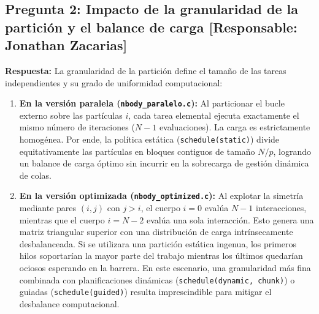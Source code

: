 \documentclass[11pt,a4paper]{article}
\begin{document}
\vspace{0.5cm}

\subsection*{Pregunta 2: Impacto de la granularidad de la partición y el balance de carga [Responsable: Jonathan Zacarias]}

\textbf{Respuesta:}  
La granularidad de la partición define el tamaño de las tareas independientes y su grado de uniformidad computacional:

\begin{enumerate}
    \item \textbf{En la versión paralela (\texttt{nbody\_paralelo.c}):}
    Al particionar el bucle externo sobre las partículas $i$, cada tarea elemental ejecuta exactamente el mismo número de iteraciones ($N-1$ evaluaciones). La carga es estrictamente homogénea. Por ende, la política estática (\texttt{schedule(static)}) divide equitativamente las partículas en bloques contiguos de tamaño $N/p$, logrando un balance de carga óptimo sin incurrir en la sobrecarga de gestión dinámica de colas.
    
    \item \textbf{En la versión optimizada (\texttt{nbody\_optimized.c}):}
    Al explotar la simetría mediante pares $(i, j)$ con $j > i$, el cuerpo $i=0$ evalúa $N-1$ interacciones, mientras que el cuerpo $i=N-2$ evalúa una sola interacción. Esto genera una matriz triangular superior con una distribución de carga intrínsecamente desbalanceada. Si se utilizara una partición estática ingenua, los primeros hilos soportarían la mayor parte del trabajo mientras los últimos quedarían ociosos esperando en la barrera. En este escenario, una granularidad más fina combinada con planificaciones dinámicas (\texttt{schedule(dynamic, chunk)}) o guiadas (\texttt{schedule(guided)}) resulta imprescindible para mitigar el desbalance computacional.
\end{enumerate}

\vspace{0.5cm}
\end{document}
